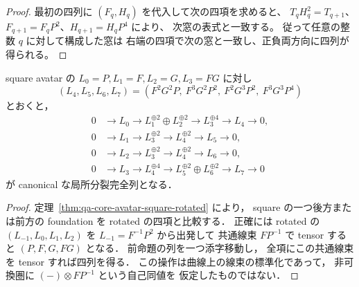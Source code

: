 \begin{proof}
最初の四列に $(F_q,H_q)$ を代入して次の四項を求めると、
$T_qH_q^2=T_{q+1}$、
$F_{q+1}=F_qP^2$、$H_{q+1}=H_qP^4$ により、
次窓の表式と一致する。
従って任意の整数 $q$ に対して構成した窓は
右端の四項で次の窓と一致し、正負両方向に四列が得られる。
\end{proof}

\begin{corollary}
\label{cor:qa-core-square-complexes}
square avatar の $L_0=P,L_1=F,L_2=G,L_3=FG$ に対し
\[
(L_4,L_5,L_6,L_7)
=(F^2G^2P,\ F^3G^2P^2,\ F^2G^3P^2,\ F^3G^3P^4)
\]
とおくと，
\begin{align*}
0&\to L_0\to L_1^{\oplus2}\oplus L_2^{\oplus2}
       \to L_3^{\oplus4}\to L_4\to0,\\
0&\to L_1\to L_3^{\oplus2}\to L_4^{\oplus2}
       \to L_5\to0,\\
0&\to L_2\to L_3^{\oplus2}\to L_4^{\oplus2}
       \to L_6\to0,\\
0&\to L_3\to L_4^{\oplus4}
       \to L_5^{\oplus2}\oplus L_6^{\oplus2}
       \to L_7\to0
\end{align*}
が canonical な局所分裂完全列となる．
\end{corollary}
\begin{proof}
定理~\ref{thm:qa-core-avatar-square-rotated} により，
square の一つ後方または前方の foundation を
rotated の四項と比較する．
正確には rotated の $(L_{-1},L_0,L_1,L_2)$ を
$L_{-1}=F^{-1}P^2$ から出発して
共通線束 $FP^{-1}$ で tensor すると
$(P,F,G,FG)$ となる．
前命題の列を一つ添字移動し，
全項にこの共通線束を tensor すれば四列を得る．
この操作は曲線上の線束の標準化であって，
非可換圏に $(-)\otimes FP^{-1}$ という自己同値を
仮定したものではない．
\end{proof}

